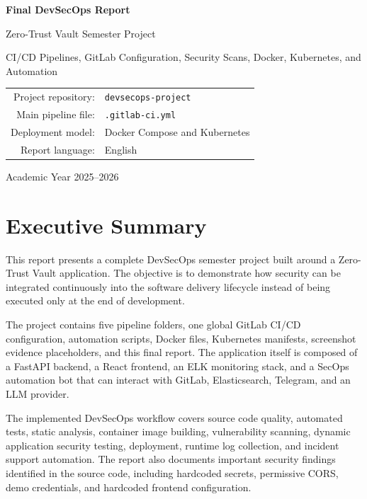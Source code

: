 \documentclass[12pt,a4paper]{report}
\begin{document}
\begin{titlepage}
    \centering
    \vspace*{1.5cm}
    {\Huge\bfseries Final DevSecOps Report\par}
    \vspace{0.5cm}
    {\Large Zero-Trust Vault Semester Project\par}
    \vspace{1.2cm}
    {\large CI/CD Pipelines, GitLab Configuration, Security Scans, Docker, Kubernetes, and Automation\par}
    \vfill
    \begin{tabular}{rl}
        Project repository: & \texttt{devsecops-project} \\
        Main pipeline file: & \texttt{.gitlab-ci.yml} \\
        Deployment model: & Docker Compose and Kubernetes \\
        Report language: & English \\
    \end{tabular}
    \vfill
    {\large Academic Year 2025--2026\par}
\end{titlepage}

\tableofcontents
\listoffigures
\listoftables
\newpage
{}

\chapter*{Executive Summary}

This report presents a complete DevSecOps semester project built around a Zero-Trust Vault application. The objective is to demonstrate how security can be integrated continuously into the software delivery lifecycle instead of being executed only at the end of development.

The project contains five pipeline folders, one global GitLab CI/CD configuration, automation scripts, Docker files, Kubernetes manifests, screenshot evidence placeholders, and this final report. The application itself is composed of a FastAPI backend, a React frontend, an ELK monitoring stack, and a SecOps automation bot that can interact with GitLab, Elasticsearch, Telegram, and an LLM provider.

The implemented DevSecOps workflow covers source code quality, automated tests, static analysis, container image building, vulnerability scanning, dynamic application security testing, deployment, runtime log collection, and incident support automation. The report also documents important security findings identified in the source code, including hardcoded secrets, permissive CORS, demo credentials, and hardcoded frontend configuration.
\end{document}
